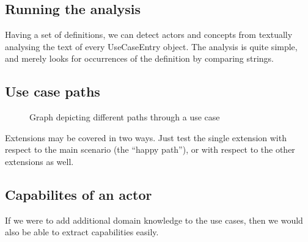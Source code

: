 \subsection{Running the analysis}
Having a set of definitions, we can detect actors and concepts from textually analysing the text of every UseCaseEntry object. The analysis is quite simple, and merely looks for occurrences of the definition by comparing strings.

\subsection{Use case paths}
\begin{figure}[!htbp]
\centering
{}
\caption{Graph depicting different paths through a use case}
\label{fig:application graphs}
\end{figure}


Extensions may be covered in two ways. Just test the single extension with respect to the main scenario (the ``happy path''), or with respect to the other extensions as well.

\subsection{Capabilites of an actor}
If we were to add additional domain knowledge to the use cases, then we would also be able to extract capabilities easily.

